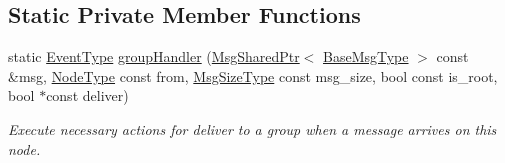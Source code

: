 \subsection*{Static Private Member Functions}
\begin{DoxyCompactItemize}
\item 
static \hyperlink{namespacevt_a009267401def7ae8bf201892222d060f}{Event\+Type} \hyperlink{structvt_1_1group_1_1_group_manager_ae0ce8441ff4ce04493ff029c2f7ba027}{group\+Handler} (\hyperlink{namespacevt_ab2b3d506ec8e8d1540aede826d84a239}{Msg\+Shared\+Ptr}$<$ \hyperlink{namespacevt_a44d0d4e144748f2b19a1cfd962f50338}{Base\+Msg\+Type} $>$ const \&msg, \hyperlink{namespacevt_a866da9d0efc19c0a1ce79e9e492f47e2}{Node\+Type} const from, \hyperlink{namespacevt_abfa009d900299ac1df967b40ea8f2c8a}{Msg\+Size\+Type} const msg\+\_\+size, bool const is\+\_\+root, bool $\ast$const deliver)
\begin{DoxyCompactList}\small\item\em Execute necessary actions for deliver to a group when a message arrives on this node. \end{DoxyCompactList}\end{DoxyCompactItemize}
